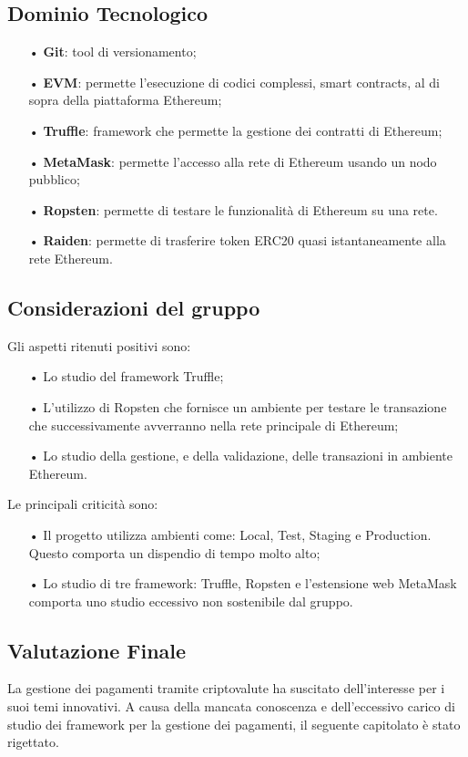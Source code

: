 \subsection{Dominio Tecnologico}
\begin{itemize}

\item[•] \textbf{Git}: tool di versionamento;
\item[•] \textbf{EVM}: permette l’esecuzione di codici complessi, smart contracts, al di sopra della piattaforma Ethereum;
\item[•] \textbf{Truffle}: framework che permette la gestione dei contratti di Ethereum;
\item[•] \textbf{MetaMask}: 
permette l'accesso alla rete di Ethereum usando un nodo pubblico; 
\item[•] \textbf{Ropsten}: permette di testare le funzionalità di Ethereum su una rete. 
\item[•] \textbf{Raiden}: permette di trasferire token ERC20 quasi istantaneamente alla rete Ethereum.

\end{itemize}

\subsection{Considerazioni del gruppo}

Gli aspetti ritenuti positivi sono: 
\begin{itemize}

\item[•] Lo studio del framework Truffle;
\item[•] L'utilizzo di Ropsten che fornisce un ambiente per testare le transazione che successivamente avverranno nella rete principale di Ethereum;
\item[•] Lo studio della gestione, e della validazione, delle transazioni in ambiente Ethereum.
\newline
\end{itemize}

Le principali criticità sono: 
\begin{itemize}

\item[•] Il progetto utilizza ambienti come: Local, Test, Staging e Production. Questo comporta un dispendio di tempo molto alto;

\item[•] Lo studio di tre framework: Truffle, Ropsten e l'estensione web MetaMask comporta uno studio eccessivo non sostenibile dal gruppo.

\end{itemize}


\subsection{Valutazione Finale}
La gestione dei pagamenti tramite criptovalute ha suscitato dell'interesse per i suoi temi innovativi. 
A causa della mancata conoscenza e dell'eccessivo carico di studio dei framework per la gestione dei pagamenti, il seguente capitolato è stato rigettato. 
